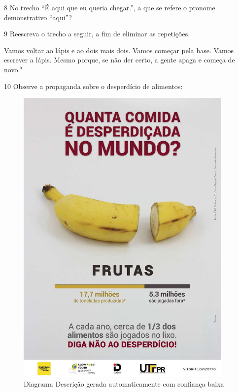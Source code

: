 {\num{8} No trecho ``É aqui que eu queria chegar.'', a que se refere o
pronome demonstrativo ``aqui''?



\num{9} Reescreva o trecho a seguir, a fim de eliminar as repetições.

Vamos voltar ao lápis e ao dois mais dois. Vamos começar pela base.
Vamos escrever a lápis. Mesmo porque, se não der certo, a gente apaga e
começa de novo."



\num{10} Observe a propaganda sobre o desperdício de alimentos:

\begin{figure}
\centering
\includegraphics[width=4.175in,height=5.91098in]{./imgSAEB_6_POR/media/image31.jpeg}
\caption{Diagrama Descrição gerada automaticamente com confiança baixa}
\end{figure}

}
